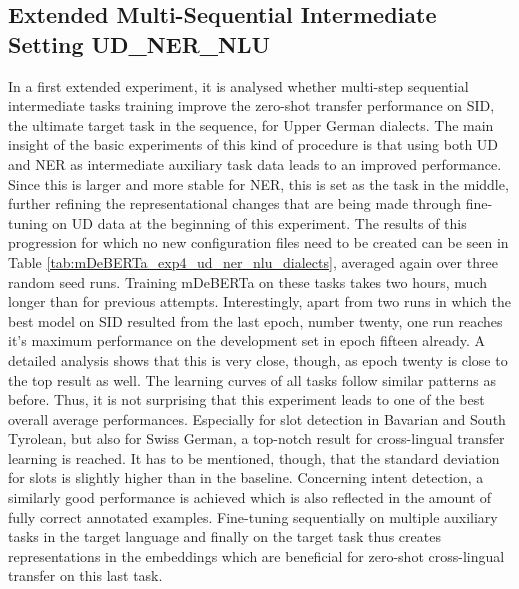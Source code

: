 \documentclass[11pt,a4paper,twoside,openright]{scrbook}
\begin{document}
\subsection{Extended Multi-Sequential Intermediate Setting UD\_NER\_NLU}

In a first extended experiment, it is analysed whether multi-step sequential intermediate tasks training improve the zero-shot transfer performance on SID, the ultimate target task in the sequence, for Upper German dialects. The main insight of the basic experiments of this kind of procedure is that using both UD and NER as intermediate auxiliary task data leads to an improved performance. Since this is larger and more stable for NER, this is set as the task in the middle, further refining the representational changes that are being made through fine-tuning on UD data at the beginning of this experiment. The results of this progression for which no new configuration files need to be created can be seen in Table \ref{tab:mDeBERTa_exp4_ud_ner_nlu_dialects}, averaged again over three random seed runs. Training mDeBERTa on these tasks takes two hours, much longer than for previous attempts. Interestingly, apart from two runs in which the best model on SID resulted from the last epoch, number twenty, one run reaches it's maximum performance on the development set in epoch fifteen already. A detailed analysis shows that this is very close, though, as epoch twenty is close to the top result as well. The learning curves of all tasks follow similar patterns as before. Thus, it is not surprising that this experiment leads to one of the best overall average performances. Especially for slot detection in Bavarian and South Tyrolean, but also for Swiss German, a top-notch result for cross-lingual transfer learning is reached. It has to be mentioned, though, that the standard deviation for slots is slightly higher than in the baseline. Concerning intent detection, a similarly good performance is achieved which is also reflected in the amount of fully correct annotated examples. Fine-tuning sequentially on multiple auxiliary tasks in the target language and finally on the target task thus creates representations in the embeddings which are beneficial for zero-shot cross-lingual transfer on this last task.
\end{document}
